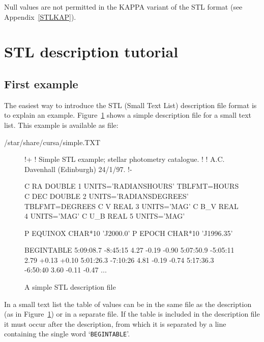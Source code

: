 \documentclass[twoside,11pt]{starlink}
\begin{document}
Null values are not permitted in the KAPPA variant of the STL format
(see Appendix~\ref{STLKAP}).


\section{\label{STLTUT}STL description tutorial}

\subsection{First example}

The easiest way to introduce the STL (Small Text List) description file
format is to explain an example.  Figure~\ref{DESCR_SIMPLE} shows a simple
description file for a small text list.  This example is available as
file:

\begin{terminalv}
/star/share/cursa/simple.TXT
\end{terminalv}

\begin{figure}[htbp]


\begin{terminalv}
!+
! Simple STL example; stellar photometry catalogue.
!
! A.C. Davenhall (Edinburgh) 24/1/97.
!-

C RA   DOUBLE  1  UNITS='RADIANS{HOURS}'    TBLFMT=HOURS
C DEC  DOUBLE  2  UNITS='RADIANS{DEGREES}'  TBLFMT=DEGREES
C V    REAL    3  UNITS='MAG'
C B_V  REAL    4  UNITS='MAG'
C U_B  REAL    5  UNITS='MAG'

P EQUINOX  CHAR*10  'J2000.0'
P EPOCH    CHAR*10  'J1996.35'

BEGINTABLE
5:09:08.7   -8:45:15   4.27  -0.19  -0.90
5:07:50.9   -5:05:11   2.79  +0.13  +0.10
5:01:26.3   -7:10:26   4.81  -0.19  -0.74
5:17:36.3   -6:50:40   3.60  -0.11  -0.47
...
\end{terminalv}

\caption{A simple STL description file\label{DESCR_SIMPLE} }

\end{figure}

In a small text list the table of values can be in the same
file as the description (as in Figure~\ref{DESCR_SIMPLE}) or in a
separate file.
If the table is
included in the description file it must occur after the description,
from which it is separated by a line containing the single word `\texttt{BEGINTABLE}'.
\end{document}
